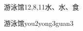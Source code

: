 \begin{entry}{游泳馆}{12,8,11}{⽔、⽔、⾷}
  \begin{phonetics}{游泳馆}{you2yong3guan3}
  \end{phonetics}
\end{entry}
